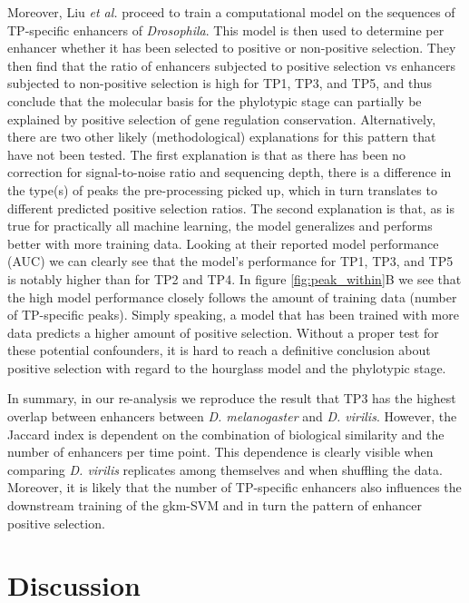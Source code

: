 Moreover, Liu \textit{et al.} proceed to train a computational model on the sequences of TP-specific enhancers of \textit{Drosophila}. This model is then used to determine per enhancer whether it has been selected to positive or non-positive selection. They then find that the ratio of enhancers subjected to positive selection vs enhancers subjected to non-positive selection is high for TP1, TP3, and TP5, and thus conclude that the molecular basis for the phylotypic stage can partially be explained by positive selection of gene regulation conservation. Alternatively, there are two other likely (methodological) explanations for this pattern that have not been tested. The first explanation is that as there has been no correction for signal-to-noise ratio and sequencing depth, there is a difference in the type(s) of peaks the pre-processing picked up, which in turn translates to different predicted positive selection ratios\cite{encode_guidelines2012,Whalen2021}. The second explanation is that, as is true for practically all machine learning, the model generalizes and performs better with more training data. Looking at their reported model performance (AUC) we can clearly see that the model's performance for TP1, TP3, and TP5 is notably higher than for TP2 and TP4. In figure \ref{fig:peak_within}B we see that the high model performance closely follows the amount of training data (number of TP-specific peaks). Simply speaking, a model that has been trained with more data predicts a higher amount of positive selection. Without a proper test for these potential confounders, it is hard to reach a definitive conclusion about positive selection with regard to the hourglass model and the phylotypic stage.

In summary, in our re-analysis we reproduce the result that TP3 has the highest overlap between enhancers between \textit{D. melanogaster} and \textit{D. virilis}. However, the Jaccard index is dependent on the combination of biological similarity and the number of enhancers per time point. This dependence is clearly visible when comparing \textit{D. virilis} replicates among themselves and when shuffling the data. Moreover, it is likely that the number of TP-specific enhancers also influences the downstream training of the gkm-SVM and in turn the pattern of enhancer positive selection. 

\section{Discussion}

